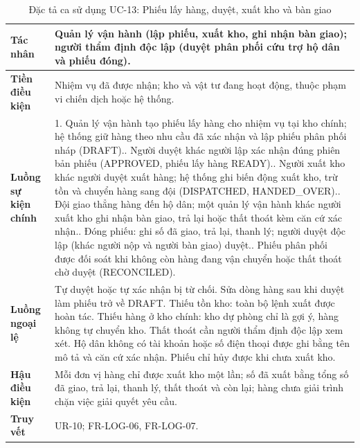 \documentclass[12pt,a4paper,oneside]{report}
\begin{document}
\begin{table}[H]
  \centering
  \caption{Đặc tả ca sử dụng UC-13: Phiếu lấy hàng, duyệt, xuất kho và bàn giao}\label{tab:uc13-spec}
  \small
  \begin{tabularx}{\textwidth}{|L{3.0cm}|Y|}
    \hline
    \textbf{Tác nhân} & Quản lý vận hành (lập phiếu, xuất kho, ghi nhận bàn giao); người thẩm định độc lập (duyệt phân phối cứu trợ hộ dân và phiếu đóng). \\
    \hline
    \textbf{Tiền điều kiện} & Nhiệm vụ đã được nhận; kho và vật tư đang hoạt động, thuộc phạm vi chiến dịch hoặc hệ thống. \\
    \hline
    \textbf{Luồng sự kiện chính} & 1. Quản lý vận hành tạo phiếu lấy hàng cho nhiệm vụ tại kho chính; hệ thống giữ hàng theo nhu cầu đã xác nhận và lập phiếu phân phối nháp (DRAFT).. Người duyệt khác người lập xác nhận đúng phiên bản phiếu (APPROVED, phiếu lấy hàng READY).. Người xuất kho khác người duyệt xuất hàng; hệ thống ghi biến động xuất kho, trừ tồn và chuyển hàng sang đội (DISPATCHED, HANDED\_OVER).. Đội giao thẳng hàng đến hộ dân; một quản lý vận hành khác người xuất kho ghi nhận bàn giao, trả lại hoặc thất thoát kèm căn cứ xác nhận.. Đóng phiếu: ghi số đã giao, trả lại, thanh lý; người duyệt độc lập (khác người nộp và người bàn giao) duyệt.. Phiếu phân phối được đối soát khi không còn hàng đang vận chuyển hoặc thất thoát chờ duyệt (RECONCILED). \\
    \hline
    \textbf{Luồng ngoại lệ} & Tự duyệt hoặc tự xác nhận bị từ chối. Sửa dòng hàng sau khi duyệt làm phiếu trở về DRAFT. Thiếu tồn kho: toàn bộ lệnh xuất được hoàn tác. Thiếu hàng ở kho chính: kho dự phòng chỉ là gợi ý, hàng không tự chuyển kho. Thất thoát cần người thẩm định độc lập xem xét. Hộ dân không có tài khoản hoặc số điện thoại được ghi bằng tên mô tả và căn cứ xác nhận. Phiếu chỉ hủy được khi chưa xuất kho. \\
    \hline
    \textbf{Hậu điều kiện} & Mỗi đơn vị hàng chỉ được xuất kho một lần; số đã xuất bằng tổng số đã giao, trả lại, thanh lý, thất thoát và còn lại; hàng chưa giải trình chặn việc giải quyết yêu cầu. \\
    \hline
    \textbf{Truy vết} & UR-10; FR-LOG-06, FR-LOG-07. \\
    \hline
  \end{tabularx}
\end{table}
\end{document}
